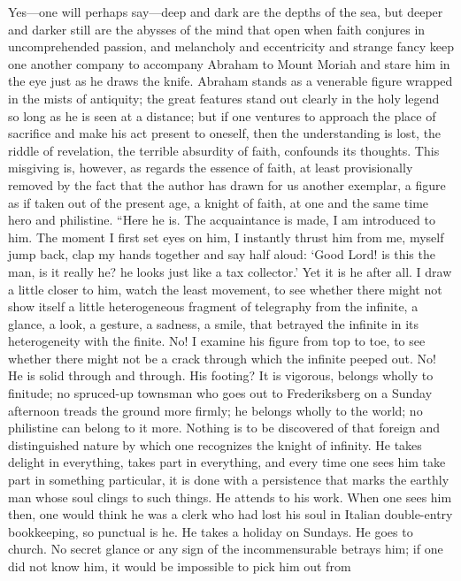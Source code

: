 \documentclass[12pt,a4paper,openany]{book}
\newcommand{\opage}[1]{\marginnote{\footnotesize\textit{[#1]}}}
\begin{document}
Yes---one will perhaps say---deep and dark are the depths of the sea, but
deeper and darker still are the abysses of the mind that open when faith
conjures in uncomprehended passion, and melancholy and eccentricity and
strange fancy keep one another company to accompany Abraham to Mount
Moriah and stare him in the eye just as he draws the knife. Abraham
stands as a venerable figure wrapped in the mists of antiquity; the great
features stand out clearly in the holy legend so long as he is seen at a
distance; but if one ventures to approach the place of sacrifice and
make his act present to oneself, then the understanding is lost, the
riddle of revelation, the terrible absurdity of faith, confounds its
thoughts. This misgiving is, however, as regards the essence of faith, at
least provisionally removed by the fact that the author has drawn for us
another exemplar, a figure as if taken out of the present age, a knight
of faith, at one and the same time hero and philistine. ``Here he is. The
acquaintance is made, I am introduced to him. The moment I first set eyes
on him, I instantly thrust him from me, myself jump back, clap my hands
together and say half aloud: `Good Lord! is this the man, is it really
he? he looks just like a tax collector.' Yet it is he after all. I draw a
little closer to him, watch the least movement, to see whether there
might not show itself \opage{58}a little heterogeneous fragment of telegraphy from
the infinite, a glance, a look, a gesture, a sadness, a smile, that
betrayed the infinite in its heterogeneity with the finite. No! I examine
his figure from top to toe, to see whether there might not be a crack
through which the infinite peeped out. No! He is solid through and
through. His footing? It is vigorous, belongs wholly to finitude; no
spruced-up townsman who goes out to Frederiksberg on a Sunday afternoon
treads the ground more firmly; he belongs wholly to the world; no
philistine can belong to it more. Nothing is to be discovered of that
foreign and distinguished nature by which one recognizes the knight of
infinity. He takes delight in everything, takes part in everything, and
every time one sees him take part in something particular, it is done
with a persistence that marks the earthly man whose soul clings to such
things. He attends to his work. When one sees him then, one would think
he was a clerk who had lost his soul in Italian double-entry
bookkeeping, so punctual is he. He takes a holiday on Sundays. He goes
to church. No secret glance or any sign of the incommensurable betrays
him; if one did not know him, it would be impossible to pick him out from
\end{document}
